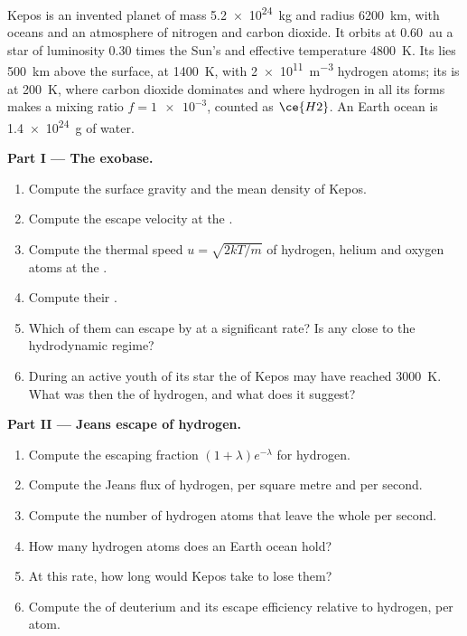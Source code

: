 \begin{problem}
\label{pb:b3:planetary-atmospheres:1}
Kepos is an invented planet of mass \qty{5.2e24}{kg} and radius
\qty{6200}{km}, with oceans and an atmosphere of nitrogen and carbon
dioxide. It orbits at \qty{0.60}{au} a star of luminosity 0.30 times the
Sun's and effective temperature \qty{4800}{K}. Its  lies
\qty{500}{km} above the surface, at \qty{1400}{K}, with
\qty{2e11}{m^{-3}} hydrogen atoms; its  is at \qty{200}{K},
where carbon dioxide dominates and where hydrogen in all its forms makes a
mixing ratio $f = \num{1e-3}$, counted as $\ce{H2}$. An Earth ocean is
\qty{1.4e24}{g} of water.

\medskip\noindent\textbf{Part I --- The exobase.}
\begin{enumerate}
\item Compute the surface gravity and the mean density of Kepos.
\item Compute the escape velocity at the .
\item Compute the thermal speed $u = \sqrt{2kT/m}$ of hydrogen, helium and
  oxygen atoms at the .
\item Compute their .
\item Which of them can escape by  at a significant rate?
  Is any close to the hydrodynamic regime?
\item During an active youth of its star the  of Kepos may have
  reached \qty{3000}{K}. What was then the  of hydrogen,
  and what does it suggest?
\end{enumerate}

\medskip\noindent\textbf{Part II --- Jeans escape of hydrogen.}
\begin{enumerate}[resume]
\item Compute the escaping fraction $(1 + \lambda)e^{-\lambda}$ for
  hydrogen.
\item Compute the Jeans flux of hydrogen, per square metre and per second.
\item Compute the number of hydrogen atoms that leave the whole 
  per second.
\item How many hydrogen atoms does an Earth ocean hold?
\item At this rate, how long would Kepos take to lose them?
\item Compute the  of deuterium and its escape efficiency
  relative to hydrogen, per atom.
\end{enumerate}


\end{problem}
